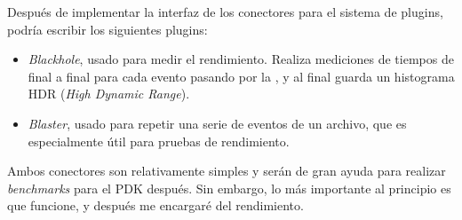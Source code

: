 Después de implementar la interfaz de los conectores para el sistema de plugins,
podría escribir los siguientes plugins:

\begin{itemize}
    \item \emph{Blackhole}, usado para medir el rendimiento. Realiza mediciones
        de tiempos de final a final para cada evento pasando por la \pipeline, y
        al final guarda un histograma HDR (\emph{High Dynamic Range}).

    \item \emph{Blaster}, usado para repetir una serie de eventos de un archivo,
        que es especialmente útil para pruebas de rendimiento.

\end{itemize}

Ambos conectores son relativamente simples y serán de gran ayuda para realizar
\emph{benchmarks} para el PDK después. Sin embargo, lo más importante al
principio es que funcione, y después me encargaré del rendimiento.
